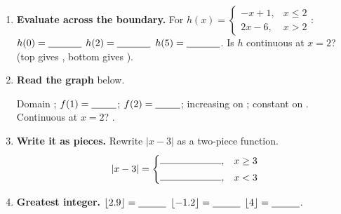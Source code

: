 \documentclass[10pt]{article}
\newcommand{\lgrid}[4]{%
  \draw[step=1, linegray!40, very thin] (#1,#3) grid (#2,#4);
  \draw[->, semithick, charcoal] (#1,0)--(#2,0) node[below right, font=\scriptsize]{$x$};
  \draw[->, semithick, charcoal] (0,#3)--(0,#4) node[left, font=\scriptsize]{$y$};}
\newcommand{\closeddot}[2]{\fill[forest] (#1,#2) circle (3.5pt);}
\newcommand{\opendot}[2]{\draw[very thick, forest, fill=white] (#1,#2) circle (3.5pt);}
\begin{document}
\begin{tcolorbox}[colback=white, colframe=black!40, title=\textbf{Tier A --- Approaching Proficiency},
    fonttitle=\bfseries, arc=1.5mm, left=3mm, right=3mm, top=2mm, bottom=2mm, breakable]
\begin{enumerate}[leftmargin=1.7em, itemsep=10pt]
  \item \textbf{Evaluate across the boundary.} For $h(x)=\begin{cases} -x+1, & x\le 2 \\ 2x-6, & x>2 \end{cases}$:
        \\[3pt]
        $h(0)=\blank{1.2cm}$ \quad $h(2)=\blank{1.2cm}$ \quad $h(5)=\blank{1.2cm}$. \quad
        Is $h$ continuous at $x=2$? \blank{1.4cm} \; (top gives \blank{0.8cm}, bottom gives \blank{0.8cm}).
  \item \textbf{Read the graph} below.
        \begin{center}
        \end{center}
        Domain \blank{2.2cm}; \; $f(1)=\blank{0.9cm}$; \; $f(2)=\blank{0.9cm}$; \; increasing on
        \blank{1.8cm}; \; constant on \blank{1.8cm}. \; Continuous at $x=2$? \blank{1.4cm}.
  \item \textbf{Write it as pieces.} Rewrite $|x-3|$ as a two-piece function.
        \[ |x-3|=\begin{cases} \rule{2.2cm}{0.4pt}, & x\ge 3 \\[3pt] \rule{2.2cm}{0.4pt}, & x<3 \end{cases} \]
  \item \textbf{Greatest integer.} $\lfloor 2.9\rfloor=\blank{1.0cm}$ \quad
        $\lfloor -1.2\rfloor=\blank{1.0cm}$ \quad $\lfloor 4\rfloor=\blank{1.0cm}$.
\end{enumerate}
\end{tcolorbox}
\end{document}
